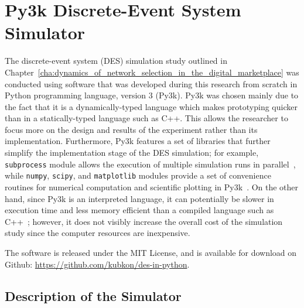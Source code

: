 \chapter{Py3k Discrete-Event System Simulator}
\label{cha:py3k_discrete_event_system_simulator}

\minitoc
\vspace{10mm}

The discrete-event system (DES) simulation study outlined in Chapter~\ref{cha:dynamics_of_network_selection_in_the_digital_marketplace} was conducted using software that was developed during this research from scratch in Python programming language, version 3 (Py3k). Py3k was chosen mainly due to the fact that it is a dynamically-typed language which makes prototyping quicker than in a statically-typed language such as C++. This allows the researcher to focus more on the design and results of the experiment rather than its implementation. Furthermore, Py3k features a set of libraries that further simplify the implementation stage of the DES simulation; for example, \lstinline{subprocess} module allows the execution of multiple simulation runs in parallel~\cite{Py3kSubprocess}, while \lstinline{numpy}, \lstinline{scipy}, and \lstinline{matplotlib} modules provide a set of convenience routines for numerical computation and scientific plotting in Py3k~\cite{Numpy, Scipy, Matplotlib}. On the other hand, since Py3k is an interpreted language, it can potentially be slower in execution time and less memory efficient than a compiled language such as C++~\cite{Py3kC++}; however, it does not visibly increase the overall cost of the simulation study since the computer resources are inexpensive.

The software is released under the MIT License, and is available for download on Github: \url{https://github.com/kubkon/des-in-python}.

\section{Description of the Simulator}
\label{sec:description_of_the_simulator_simappendix}

